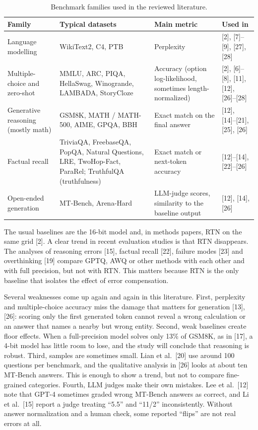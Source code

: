 \documentclass[10pt,twocolumn]{article}
\begin{document}
\begin{table}[t]
\centering
\small
\caption{Benchmark families used in the reviewed literature.}
\label{tab:bench}
\begin{tabularx}{\textwidth}{@{}p{} L p{0.22\textwidth} p{0.2\textwidth}@{}}
\toprule
\textbf{Family} & \textbf{Typical datasets} & \textbf{Main metric} &
\textbf{Used in} \\
\midrule
Language modelling & WikiText2, C4, PTB & Perplexity & [2], [7]--[9],
[27], [28] \\
Multiple-choice and zero-shot & MMLU, ARC, PIQA, HellaSwag, Winogrande,
LAMBADA, StoryCloze & Accuracy (option log-likelihood, sometimes
length-normalized) & [2], [6]--[8], [11], [12], [26]--[28] \\
Generative reasoning (mostly math) & GSM8K, MATH / MATH-500, AIME, GPQA,
BBH & Exact match on the final answer & [12], [14]--[21], [25], [26] \\
Factual recall & TriviaQA, FreebaseQA, PopQA, Natural Questions, LRE,
TwoHop-Fact, ParaRel; TruthfulQA (truthfulness) & Exact match or
next-token accuracy & [12]--[14], [22]--[26] \\
Open-ended generation & MT-Bench, Arena-Hard & LLM-judge scores,
similarity to the baseline output & [12], [14], [26] \\
\bottomrule
\end{tabularx}
\end{table}

The usual baselines are the 16-bit model and, in methods papers, RTN on
the same grid [2]. A clear trend in recent evaluation studies is that
RTN disappears. The analyses of reasoning errors [15], factual recall
[22], failure modes [23] and overthinking [19] compare GPTQ, AWQ or
other methods with each other and with full precision, but not with RTN.
This matters because RTN is the only baseline that isolates the effect
of error compensation.

Several weaknesses come up again and again in this literature. First,
perplexity and multiple-choice accuracy miss the damage that matters for
generation [13], [26]: scoring only the first generated token cannot
reveal a wrong calculation or an answer that names a nearby but wrong
entity. Second, weak baselines create floor effects. When a
full-precision model solves only 13\% of GSM8K, as in [17], a 4-bit
model has little room to lose, and the study will conclude that
reasoning is robust. Third, samples are sometimes small. Lian et al.~[20]
use around 100 questions per benchmark, and the qualitative analysis in
[26] looks at about ten MT-Bench answers. This is enough to show a
trend, but not to compare fine-grained categories. Fourth, LLM judges
make their own mistakes. Lee et al.~[12] note that GPT-4 sometimes
graded wrong MT-Bench answers as correct, and Li et al.~[15] report a
judge treating ``5.5'' and ``11/2'' inconsistently. Without answer
normalization and a human check, some reported ``flips'' are not real
errors at all.
\end{document}
